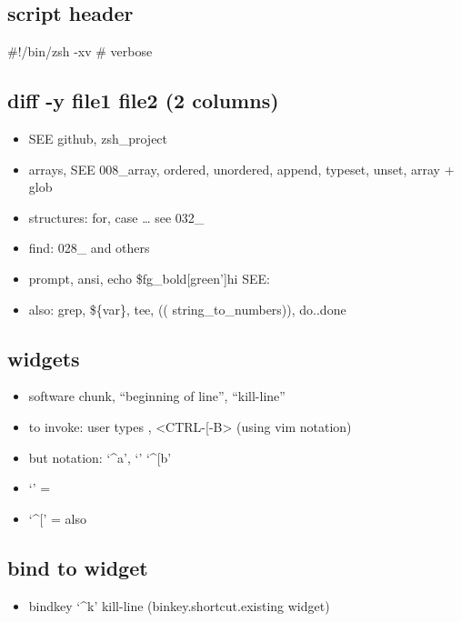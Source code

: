 \documentclass[
]{report}
\providecommand{\tightlist}{%
  \setlength{\itemsep}{0pt}\setlength{\parskip}{0pt}}\usepackage{longtable,booktabs,array}
\begin{document}
\subsection{script header}\label{script-header}

\#!/bin/zsh -xv \# verbose

\subsection{diff -y file1 file2 (2
columns)}\label{diff--y-file1-file2-2-columns}

\begin{itemize}
\tightlist
\item
  SEE github, zsh\_project
\item
  arrays, SEE 008\_array, ordered, unordered, append, typeset, unset,
  array + glob
\item
  structures: for, case \ldots{} see 032\_
\item
  find: 028\_ and others
\item
  prompt, ansi, echo \$fg\_bold{[}green'{]}hi SEE:
\item
  also: grep, \$\{var\}, tee, (( string\_to\_numbers)), do..done
\end{itemize}

\subsection{widgets}\label{widgets}

\begin{itemize}
\tightlist
\item
  software chunk, ``beginning of line'', ``kill-line''
\item
  to invoke: user types , \textless CTRL-{[}-B\textgreater{} (using vim
  notation)
\item
  but notation: `\^{}a', `\eb' `\^{}{[}b'
\item
  `\e' =
\item
  `\^{}{[}' = also
\end{itemize}

\subsection{bind to widget}\label{bind-to-widget}

\begin{itemize}
\tightlist
\item
  bindkey `\^{}k' kill-line (binkey.shortcut.existing widget)
\end{itemize}
\end{document}
